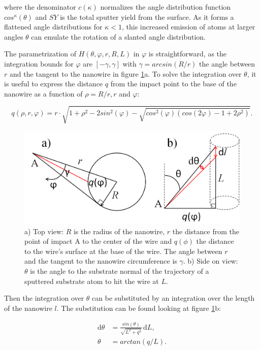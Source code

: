where the denominator $c(\kappa)$ normalizes the angle distribution function $cos^\kappa(\theta)$ and $SY$ is the total sputter yield from the surface. As it forms a flattened angle distributions for $\kappa < 1$, this increased emission of atoms at larger angles $\theta$ can emulate the rotation of a slanted angle distribution.

The parametrization of $H(\theta,\varphi,r,R,L)$ in $\varphi$ is straightforward, as the integration bounds for $\varphi$ are $[-\gamma, \gamma]$ with $\gamma = arcsin(R/r)$ the angle between $r$ and the tangent to the nanowire in figure \ref{anglesredepo}a. To solve the integration over $\theta$, it is useful to express the distance $q$ from the impact point to the base of the nanowire as a function of $\rho = R/r, r$ and $\varphi$:

\begin{equation}
q(\rho,r,\varphi) = r\cdot \sqrt{1 + \rho^2 - 2sin^2(\varphi) - \sqrt{cos^2(\varphi)(cos(2\varphi) - 1 + 2\rho^2)}}.
\end{equation}

\begin{figure}
	\centering
		\includegraphics[width=.65\textwidth]{images/anglesredeposition.jpg}
	\caption{a) Top view: $R$ is the radius of the nanowire, $r$ the distance from the point of impact A to the center of the wire and $q(\phi)$ the distance to the wire's surface at the base of the wire. The angle between $r$ and the tangent to the nanowire circumference is $\gamma$. b) Side on view: $\theta$ is the angle to the substrate normal of the trajectory of a sputtered substrate atom to hit the wire at $L$.} 
	\label{anglesredepo}
\end{figure} 

Then the integration over $\theta$ can be substituted by an integration over the length of the nanowire $l$. The substitution can be found looking at figure \ref{anglesredepo}b:

\begin{align*}
\mathrm{d}\theta &= \frac{sin(\theta)}{\sqrt{L^2 + q^2}}\,\mathrm{d}L,\\
\theta &= arctan(q/L).
\end{align*}

